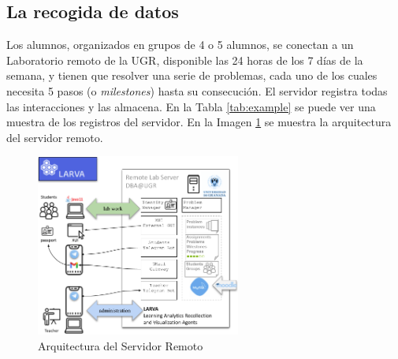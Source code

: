 \subsection{La recogida de datos}

Los alumnos, organizados en grupos de 4 o 5 alumnos, se conectan a un Laboratorio remoto de la UGR, disponible las 24 horas de los 7 días de la semana, y tienen que resolver una serie de problemas, cada uno de los cuales necesita 5 pasos (o \textit{milestones}) hasta su consecución. El servidor registra todas las interacciones y las almacena. En la Tabla \ref{tab:example} se puede ver una muestra de los registros del servidor. En la Imagen \ref{fig:architecture} se muestra la arquitectura del servidor remoto.

\begin{figure}[H]
    \centering
    \includegraphics[width=0.60\textwidth]{imagenes/LARVA2122Architecturec.png}
    \caption{Arquitectura del Servidor Remoto}
    \label{fig:architecture}
\end{figure}

